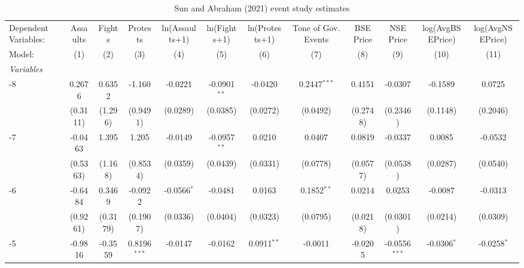
\begin{table}[htbp]
   \caption{\label{tab:sunab} Sun and Abraham (2021) event study estimates}
   \centering
   \begin{tabular}{lccccccccccc}
      \tabularnewline \midrule \midrule
      Dependent Variables: & Assaults       & Fights        & Protests       & ln(Assaults+1) & ln(Fights+1)   & ln(Protests+1) & Tone of Gov. Events & BSE Price       & NSE Price       & log(AvgBSEPrice) & log(AvgNSEPrice)\\  
      Model:               & (1)            & (2)           & (3)            & (4)            & (5)            & (6)            & (7)                 & (8)             & (9)             & (10)             & (11)\\  
      \midrule
      \emph{Variables}\\
      -8                   & 0.2676         & 0.6352        & -1.160         & -0.0221        & -0.0901$^{**}$ & -0.0420        & 0.2447$^{***}$      & 0.4151          & -0.0307         & -0.1589          & 0.0725\\   
                           & (0.3111)       & (1.296)       & (0.9491)       & (0.0289)       & (0.0385)       & (0.0272)       & (0.0492)            & (0.2748)        & (0.2346)        & (0.1148)         & (0.2046)\\   
      -7                   & -0.0463        & 1.395         & 1.205          & -0.0149        & -0.0957$^{**}$ & 0.0210         & 0.0407              & 0.0819          & -0.0337         & 0.0085           & -0.0532\\   
                           & (0.5363)       & (1.168)       & (0.8534)       & (0.0359)       & (0.0439)       & (0.0331)       & (0.0778)            & (0.0577)        & (0.0538)        & (0.0287)         & (0.0540)\\   
      -6                   & -0.6484        & 0.3469        & -0.0922        & -0.0566$^{*}$  & -0.0481        & 0.0163         & 0.1852$^{**}$       & 0.0214          & 0.0253          & -0.0087          & -0.0313\\   
                           & (0.9261)       & (0.3179)      & (0.1907)       & (0.0336)       & (0.0404)       & (0.0323)       & (0.0795)            & (0.0218)        & (0.0301)        & (0.0214)         & (0.0309)\\   
      -5                   & -0.9816        & -0.3559       & 0.8196$^{***}$ & -0.0147        & -0.0162        & 0.0911$^{**}$  & -0.0011             & -0.0205         & -0.0556$^{***}$ & -0.0306$^{*}$    & -0.0258$^{*}$\\   

\end{tabular}
\end{table}
